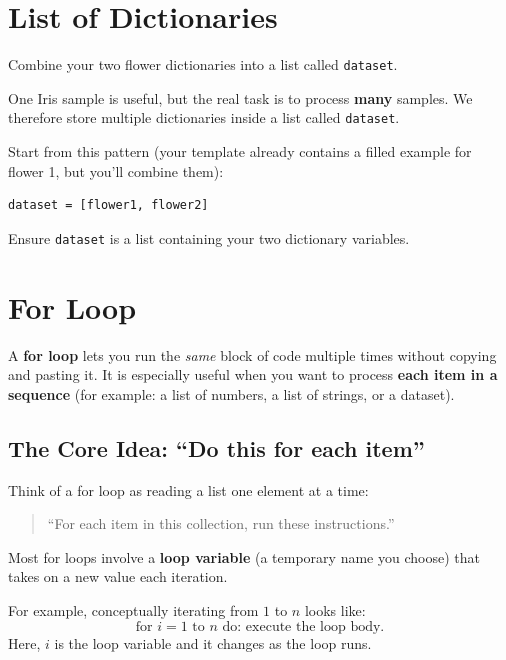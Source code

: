 \section{List of Dictionaries}
\label{sec:ses3_list_of_dicts}

\noindent
\begin{tcolorbox}[title=Task 2: Create list of dictionaries]
Combine your two flower dictionaries into a list called \texttt{dataset}.
\end{tcolorbox}

One Iris sample is useful, but the real task is to process \textbf{many} samples.
We therefore store multiple dictionaries inside a list called \texttt{dataset}.

Start from this pattern (your template already contains a filled example for flower 1, but you'll combine them):
\begin{verbatim}
dataset = [flower1, flower2]
\end{verbatim}

\begin{tcolorbox}[title=Checkpoint]
Ensure \texttt{dataset} is a list containing your two dictionary variables.
\end{tcolorbox}

\section{For Loop}

A \textbf{for loop} lets you run the \emph{same} block of code multiple times without copying and pasting it. It is especially useful when you want to process \textbf{each item in a sequence} (for example: a list of numbers, a list of strings, or a dataset).

\subsection{The Core Idea: ``Do this for each item''}
Think of a for loop as reading a list one element at a time:
\begin{quote}
``For each item in this collection, run these instructions.''
\end{quote}

Most for loops involve a \textbf{loop variable} (a temporary name you choose) that takes on a new value each iteration.

For example, conceptually iterating from $1$ to $n$ looks like:
\[
\text{for } i = 1 \text{ to } n \text{ do: execute the loop body.}
\]
Here, $i$ is the loop variable and it changes as the loop runs.

